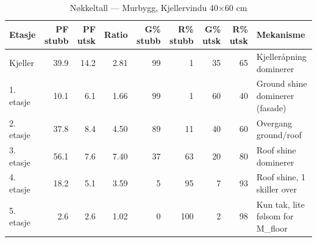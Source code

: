 \begin{table}[h]
\centering
\caption{Nøkkeltall — Murbygg, Kjellervindu 40×60 cm}
\label{tab:main_findings_murbygg}
\small
\begin{tabular}{lrrrrrrrl}
\toprule
Etasje & PF stubb & PF utsk & Ratio & G\% stubb & R\% stubb & G\% utsk & R\% utsk & Mekanisme \\
\midrule
Kjeller & 39.9 & 14.2 & 2.81 & 99 & 1 & 35 & 65 & Kjelleråpning dominerer \\
1. etasje & 10.1 & 6.1 & 1.66 & 99 & 1 & 60 & 40 & Ground shine dominerer (fasade) \\
2. etasje & 37.8 & 8.4 & 4.50 & 89 & 11 & 40 & 60 & Overgang ground/roof \\
3. etasje & 56.1 & 7.6 & 7.40 & 37 & 63 & 20 & 80 & Roof shine dominerer \\
4. etasje & 18.2 & 5.1 & 3.59 & 5 & 95 & 7 & 93 & Roof shine, 1 skiller over \\
5. etasje & 2.6 & 2.6 & 1.02 & 0 & 100 & 2 & 98 & Kun tak, lite følsom for M_floor \\
\bottomrule
\end{tabular}
\end{table}